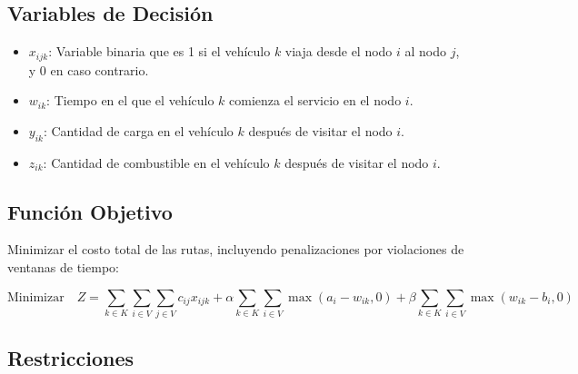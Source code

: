 \documentclass{article}
\begin{document}
\subsection{Variables de Decisión}

\begin{itemize}
    \item \( x_{ijk} \): Variable binaria que es 1 si el vehículo \( k \) viaja desde el nodo \( i \) al nodo \( j \), y 0 en caso contrario.
    \item \( w_{ik} \): Tiempo en el que el vehículo \( k \) comienza el servicio en el nodo \( i \).
    \item \( y_{ik} \): Cantidad de carga en el vehículo \( k \) después de visitar el nodo \( i \).
    \item \( z_{ik} \): Cantidad de combustible en el vehículo \( k \) después de visitar el nodo \( i \).
\end{itemize}

\subsection{Función Objetivo}

Minimizar el costo total de las rutas, incluyendo penalizaciones por violaciones de ventanas de tiempo:

\[
\text{Minimizar} \quad Z = \sum_{k \in K} \sum_{i \in V} \sum_{j \in V} c_{ij} x_{ijk} + \alpha \sum_{k \in K} \sum_{i \in V} \max(a_i - w_{ik}, 0) + \beta \sum_{k \in K} \sum_{i \in V} \max(w_{ik} - b_i, 0)
\]

\subsection{Restricciones}
\end{document}
